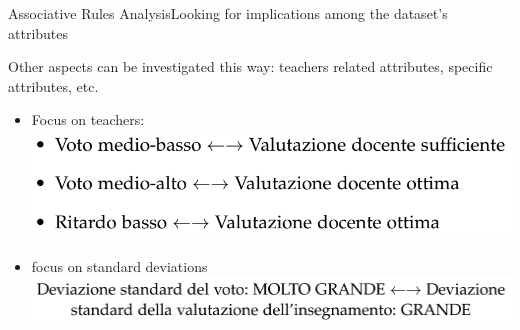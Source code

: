 \begin{frame}{Associative Rules Analysis}{Looking for implications among the dataset's attributes}

    Other aspects can be investigated this way: teachers related attributes, specific attributes, etc.

    \vspace{0.2cm}
	\begin{itemize}
		\item<1-> Focus on \alert{teachers}: \\ \vspace{0.2cm} \includegraphics[scale=0.28]{ass4.png}
		\item<2-> focus on \alert{standard deviations} \\ \vspace{0.2cm} \includegraphics[scale=0.28]{ass5.png}
	\end{itemize}

\end{frame}